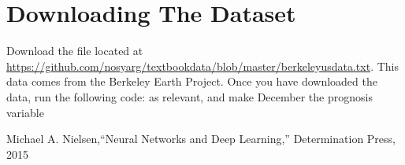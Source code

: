 \documentclass[11pt]{article}
\begin{document}
\section{Downloading The Dataset}

Download the file located at \url{https://github.com/nosyarg/textbookdata/blob/master/berkeleyusdata.txt}.
This data comes from the Berkeley Earth Project.
Once you have downloaded the data, run the following code:
as relevant, and make December the prognosis variable

\begin{thebibliography}{99}

Michael A. Nielsen,``Neural Networks and Deep Learning,'' Determination Press, 2015

\end{thebibliography}
\end{document}

